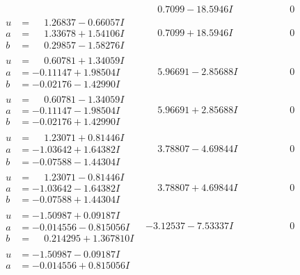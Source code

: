 \documentclass[1p]{elsarticle_modified}
\theoremstyle{definition}
\begin{document}
$$\begin{array}{c|c|c}
 & \phantom{-}0.7099 - 18.5946 I & \phantom{-0.000000 } 0 \\ \hline\begin{aligned}
u &= \phantom{-}1.26837 - 0.66057 I \\
a &= \phantom{-}1.33678 + 1.54106 I \\
b &= \phantom{-}0.29857 - 1.58276 I\end{aligned}
 & \phantom{-}0.7099 + 18.5946 I & \phantom{-0.000000 } 0 \\ \hline\begin{aligned}
u &= \phantom{-}0.60781 + 1.34059 I \\
a &= -0.11147 + 1.98504 I \\
b &= -0.02176 - 1.42990 I\end{aligned}
 & \phantom{-}5.96691 - 2.85688 I & \phantom{-0.000000 } 0 \\ \hline\begin{aligned}
u &= \phantom{-}0.60781 - 1.34059 I \\
a &= -0.11147 - 1.98504 I \\
b &= -0.02176 + 1.42990 I\end{aligned}
 & \phantom{-}5.96691 + 2.85688 I & \phantom{-0.000000 } 0 \\ \hline\begin{aligned}
u &= \phantom{-}1.23071 + 0.81446 I \\
a &= -1.03642 + 1.64382 I \\
b &= -0.07588 - 1.44304 I\end{aligned}
 & \phantom{-}3.78807 - 4.69844 I & \phantom{-0.000000 } 0 \\ \hline\begin{aligned}
u &= \phantom{-}1.23071 - 0.81446 I \\
a &= -1.03642 - 1.64382 I \\
b &= -0.07588 + 1.44304 I\end{aligned}
 & \phantom{-}3.78807 + 4.69844 I & \phantom{-0.000000 } 0 \\ \hline\begin{aligned}
u &= -1.50987 + 0.09187 I \\
a &= -0.014556 - 0.815056 I \\
b &= \phantom{-}0.214295 + 1.367810 I\end{aligned}
 & -3.12537 - 7.53337 I & \phantom{-0.000000 } 0 \\ \hline\begin{aligned}
u &= -1.50987 - 0.09187 I \\
a &= -0.014556 + 0.815056 I \\

\end{aligned}
\end{array}$$
\end{document}
